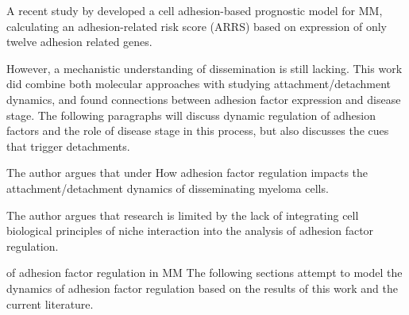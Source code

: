 A recent study by \citet{huDevelopmentCellAdhesionbased2024} developed a cell
adhesion-based prognostic model for MM, calculating an adhesion-related risk
score (ARRS) based on expression of only twelve adhesion related genes.

However, a mechanistic understanding of dissemination is still lacking. This
work did combine both molecular approaches with studying attachment/detachment
dynamics, and found connections between adhesion factor expression and disease
stage. The following paragraphs will discuss dynamic regulation of adhesion factors
and the role of disease stage in this process, but also discusses the cues that trigger
detachments.


The author argues that under
How adhesion
factor regulation impacts the attachment/detachment dynamics of disseminating
myeloma cells.

The author argues that research
is limited by the lack of integrating cell biological principles of niche
interaction into the analysis of adhesion factor regulation.


of adhesion factor regulation in MM
The following sections attempt to model the dynamics of adhesion factor
regulation based on the results of this work and the current literature.



















